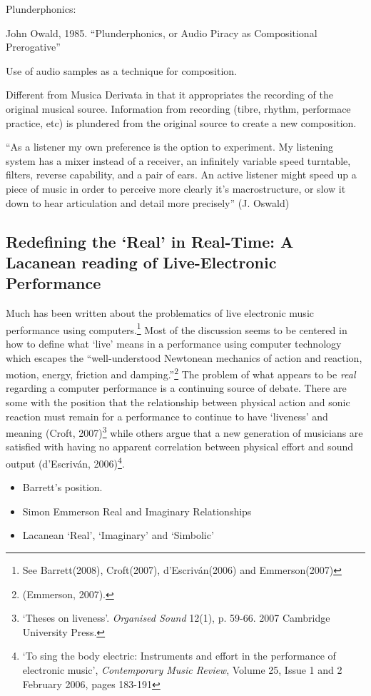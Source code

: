 Plunderphonics:

John Owald, 1985. ``Plunderphonics, or Audio Piracy as Compositional Prerogative''

Use of audio samples as a technique for composition. 

Different from Musica Derivata in that it appropriates the recording of the original musical source. Information from recording (tibre, rhythm, performace practice, etc) is plundered from the original source to create a new composition.

``As a listener my own preference is the option to experiment. My listening system has a mixer instead of a receiver, an infinitely variable speed turntable, filters, reverse capability, and a pair of ears. An active listener might speed up a piece of music in order to perceive more clearly it’s macrostructure, or slow it down to hear articulation and detail more precisely'' (J. Oswald)

\subsection{Redefining the `Real' in Real-Time: A Lacanean reading of Live-Electronic Performance}
Much has been written about the problematics of live electronic music performance using computers.\footnote{ See Barrett(2008), Croft(2007), d'Escriv\'{a}n(2006) and Emmerson(2007)} Most of the discussion seems to be centered in how to define what `live' means in a performance using computer technology which escapes the ``well-understood Newtonean mechanics of action and reaction, motion, energy, friction and damping.''\footnote{ (Emmerson, 2007).} The problem of what appears to be \emph{real} regarding a computer performance is a continuing source of debate. There are some with the position that the relationship between physical action and sonic reaction must remain for a performance to continue to have `liveness' and meaning (Croft, 2007)\footnote{`Theses on liveness'. \emph{Organised Sound} 12(1), p. 59-66. 2007 Cambridge University Press.} while others argue that a new generation of musicians are satisfied with having no apparent correlation between physical effort and sound output (d'Escriv\'{a}n, 2006)\footnote{`To sing the body electric: Instruments and effort in the performance of electronic music', \emph{Contemporary Music Review}, Volume 25, Issue 1 and 2 February 2006, pages 183-191}. 
\begin{itemize}
\item
Barrett's position. 
\item
Simon Emmerson Real and Imaginary Relationships
\item
Lacanean `Real', `Imaginary' and `Simbolic'
\end{itemize}


